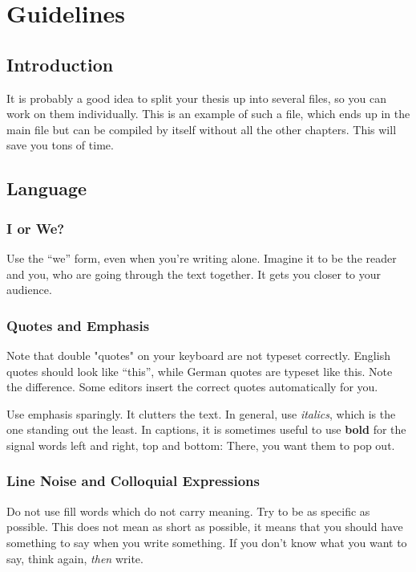 \documentclass[../{{cookiecutter.project_slug}}.tex]{subfiles}
\begin{document}
\part*{Guidelines}
\chapter{Introduction}
\label{chap:Introduction}

    It is probably a  good idea to split your thesis up  into several files, so
    you can  work on  them individually.  This  is an example  of such  a file,
    which ends up  in the main file  but can be compiled by  itself without all
    the other chapters.  This will save you tons of time.

\chapter{Language}

    \section{I or We?}

    Use the ``we'' form, even when  you're writing alone.  Imagine it to be
    the reader and  you, who are going through the  text together.  It gets
    you closer to your audience.

    \section{Quotes and Emphasis}
    Note that double "quotes" on  your keyboard are not typeset correctly. 
    English  quotes should  look like  ``this'', while  German quotes  are 
    typeset  like \glqq this\grqq.   Note the  difference.  Some  editors 
    insert the correct quotes automatically for you.                       

    Use  emphasis  sparingly.  It  clutters  the  text.  In  general,  use 
    \emph{italics}, which is the one standing out the least.  In captions, 
    it is sometimes useful to use  \textbf{bold} for the signal words left 
    and right, top and bottom: There, you want them to pop out.

    \section{Line Noise and Colloquial Expressions}

    Do  not use  fill words  which do  not carry  meaning.  Try  to be  as 
    specific as  possible.  This does  not mean  as short as  possible, it 
    means that you should have something to say when you write something.
    If you don't know what you want to say, think again, \emph{then} write.
\end{document}
